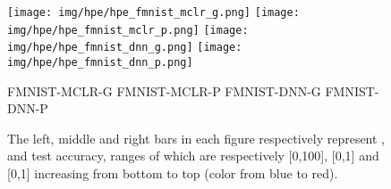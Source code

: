 \documentclass{article}
\begin{document}
\begin{figure*}[ht]\centering
    \texttt{[image: img/hpe/hpe\_fmnist\_mclr\_g.png]}
    \texttt{[image: img/hpe/hpe\_fmnist\_mclr\_p.png]}
    \texttt{[image: img/hpe/hpe\_fmnist\_dnn\_g.png]}
    \texttt{[image: img/hpe/hpe\_fmnist\_dnn\_p.png]}
    \begin{center}
        \footnotesize 
        FMNIST-MCLR-G \qquad\qquad\qquad FMNIST-MCLR-P
        \qquad\qquad\qquad\qquad
        FMNIST-DNN-G \qquad\qquad\qquad FMNIST-DNN-P
    \end{center}
    \caption{The left, middle and right bars in each figure respectively represent ,  and test accuracy, ranges of which are respectively [0,100], [0,1] and [0,1] increasing from bottom to top (color from blue to red).}
    \label{appdx_fig_hpe_fmnist}
\end{figure*}
\end{document}
